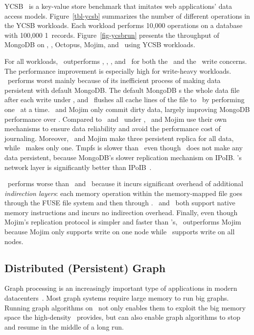 YCSB~\cite{Cooper10-CloudCom} is a key-value store benchmark 
that imitates web applications' data access models. 
Figure~\ref{tbl-ycsb} summarizes the number of different operations in the YCSB workloads.
Each workload performs 10,000 operations on a database with 100,000 1\KB\ records.
Figure~\ref{fig-ycsbrun} presents the throughput of MongoDB on \tmpfs, \pmfs, Octopus, Mojim, and \hotpot\ using YCSB workloads. 

For all workloads, \hotpot\ outperforms \tmpfs, \pmfs, \Octopus, and \Mojim\ for both the \journaled\ and the \fsyncsafe\ write concerns. 
The performance improvement is especially high for write-heavy workloads.
\pmfs\ performs worst mainly because of its inefficient process of making data persistent with default MongoDB.
The default MongoDB \fsync{}s the whole data file after each write under \fsyncsafe,
and \pmfs\ flushes all cache lines of the file to \nvm\ by performing one \clflush\ at a time.
\hotpot\ and Mojim only commit dirty data, largely improving MongoDB performance over \pmfs.
Compared to \tmpfs\ and \pmfs\ under \journaled, \hotpot\ and Mojim use their own mechanisms to 
ensure data reliability and avoid the performance cost of journaling.
Moreover, \hotpot\ and Mojim make three persistent replica for all data, while \pmfs\ makes only one.
Tmpfs is slower than \hotpot\ even though \tmpfs\ does not make any data persistent, 
because MongoDB's slower replication mechanism on IPoIB.
\hotpot's network layer is significantly better than IPoIB~\cite{lite-sosp17}.

\Octopus\ performs worse than \hotpot\ and \Mojim\ because it incurs significant overhead of additional {\em indirection layers}:
each memory operation within the memory-mapped file goes through the FUSE file system and then through \Octopus.
\hotpot\ and \Mojim\ both support native memory instructions and incurs no indirection overhead.
Finally, even though Mojim's replication protocol is simpler and faster than \hotpot's,
\hotpot\ outperforms Mojim because Mojim only supports write on one node while \hotpot\ supports write on all nodes.



\subsection{Distributed (Persistent) Graph}
Graph processing is an increasingly important type of applications in modern 
datacenters~\cite{Gonzalez12-OSDI,Gonzalez14-OSDI,Kyrola12-OSDI,Low10-UAI,Low12-VLDB,Malewicz10-SIGMOD}.
Most graph systems require large memory to run big graphs.
Running graph algorithms on \nvm\ not only enables them to exploit the big memory space the high-density \nvm\ provides,
but can also enable graph algorithms to stop and resume in the middle of a long run.

